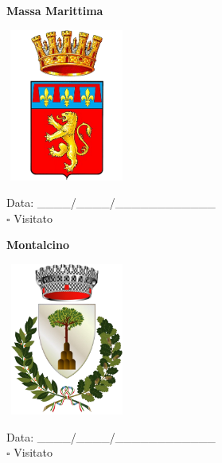 \documentclass[a5paper,12pt]{article}
\begin{document}
\vspace{0.7cm}

\noindent
\begin{minipage}[t]{0.45\textwidth}
    \begin{center}
        \textbf{Massa Marittima}
    \end{center}
    \vspace{-0.5cm} %
    \begin{center}
        \includegraphics[height= 5cm, width=4cm]{Toscana/Stemma Massa Marittima.png}
    \end{center}
    \vspace{-0.4cm} %
    \begin{flushleft}
        Data: \_\_\_\_/\_\_\_\_/\_\_\_\_\_\_\_\_\_\_\_\_ \\
        $\square$ Visitato
    \end{flushleft}
\end{minipage}
\hfill
\noindent
\begin{minipage}[t]{0.45\textwidth}
    \begin{center}
        \textbf{Montalcino}
    \end{center}
    \vspace{-0.5cm} %
    \begin{center}
        \includegraphics[height= 5cm, width=4cm]{Toscana/Stemma Montalcino.png}
    \end{center}
    \vspace{-0.4cm} %
    \begin{flushleft}
        Data: \_\_\_\_/\_\_\_\_/\_\_\_\_\_\_\_\_\_\_\_\_ \\
        $\square$ Visitato
    \end{flushleft}
\end{minipage}
\end{document}
